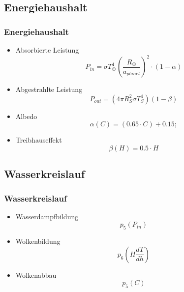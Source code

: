 \documentclass{beamer}
\begin{document}
\subsection{Energiehaushalt}
\begin{frame}
\frametitle{Energiehaushalt}
\begin{itemize}
	\item[] Absorbierte Leistung
	\begin{equation}
	P_{in} = \sigma T_{\astrosun}^4 \left( \frac{R_{\astrosun}}{a_{planet}} \right) ^2 \cdot (1-\alpha)
	\end{equation}
	\pause
	
	\item[] Abgestrahlte Leistung
	\begin{equation}
	P_{out} = (4 \pi R_{S}^2 \sigma T_{S}^4)(1 - \beta)
	\end{equation}
	\pause
	
	\item[] Albedo
	\begin{equation}
	\alpha(C) = (0.65 \cdot C) + 0.15;
	\end{equation}
	\pause
	
	\item[] Treibhauseffekt
	\begin{equation}
	\beta(H) = 0.5 \cdot H
	\end{equation}
\end{itemize}
\end{frame}




\subsection{Wasserkreislauf}

\begin{frame}
	\frametitle{Wasserkreislauf}
	\begin{itemize}
		\item[] Wasserdampfbildung
			\begin{equation}
			p_5 (P_{in})
			\end{equation} 
		\pause
		\item[] Wolkenbildung
			\begin{equation}
			p_6 \left( H \frac{dT}{dh} \right)
			\end{equation}
		\pause
		\item[] Wolkenabbau 
		 	\begin{equation}
			p_5 (C)
			\end{equation}
	\end{itemize}
\end{frame}
\end{document}
